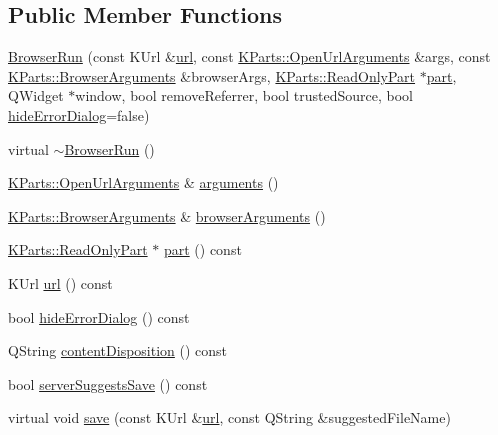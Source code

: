 \subsection*{\-Public \-Member \-Functions}
\begin{DoxyCompactItemize}
\item 
\hyperlink{classKParts_1_1BrowserRun_a48308a3cd53da552fb60a86400d06228}{\-Browser\-Run} (const \-K\-Url \&\hyperlink{classKParts_1_1BrowserRun_ad3f7d10647ab8b5a77399f46df92046b}{url}, const \hyperlink{classKParts_1_1OpenUrlArguments}{\-K\-Parts\-::\-Open\-Url\-Arguments} \&args, const \hyperlink{structKParts_1_1BrowserArguments}{\-K\-Parts\-::\-Browser\-Arguments} \&browser\-Args, \hyperlink{classKParts_1_1ReadOnlyPart}{\-K\-Parts\-::\-Read\-Only\-Part} $\ast$\hyperlink{classKParts_1_1BrowserRun_a65886b4004c00ddcc08b976f1042d0dc}{part}, \-Q\-Widget $\ast$window, bool remove\-Referrer, bool trusted\-Source, bool \hyperlink{classKParts_1_1BrowserRun_a1caa242a8389d61d6758e25a68f9df50}{hide\-Error\-Dialog}=false)
\item 
virtual \hyperlink{classKParts_1_1BrowserRun_aa141423e9096f956970d4fe92e581814}{$\sim$\-Browser\-Run} ()
\item 
\hyperlink{classKParts_1_1OpenUrlArguments}{\-K\-Parts\-::\-Open\-Url\-Arguments} \& \hyperlink{classKParts_1_1BrowserRun_a5843399feb9cafe9a2f62b258c2f5a31}{arguments} ()
\item 
\hyperlink{structKParts_1_1BrowserArguments}{\-K\-Parts\-::\-Browser\-Arguments} \& \hyperlink{classKParts_1_1BrowserRun_a7fb44c1871cf67132853d8bb59dfe006}{browser\-Arguments} ()
\item 
\hyperlink{classKParts_1_1ReadOnlyPart}{\-K\-Parts\-::\-Read\-Only\-Part} $\ast$ \hyperlink{classKParts_1_1BrowserRun_a65886b4004c00ddcc08b976f1042d0dc}{part} () const 
\item 
\-K\-Url \hyperlink{classKParts_1_1BrowserRun_ad3f7d10647ab8b5a77399f46df92046b}{url} () const 
\item 
bool \hyperlink{classKParts_1_1BrowserRun_a1caa242a8389d61d6758e25a68f9df50}{hide\-Error\-Dialog} () const 
\item 
\-Q\-String \hyperlink{classKParts_1_1BrowserRun_aa0ffe2da032f4e14eb6c7ba5f0d9996f}{content\-Disposition} () const 
\item 
bool \hyperlink{classKParts_1_1BrowserRun_a7daa3c6e44b8a37aa9c1d010972194dc}{server\-Suggests\-Save} () const 
\item 
virtual void \hyperlink{classKParts_1_1BrowserRun_acff594a6127fe8f5f19364e1da47eccf}{save} (const \-K\-Url \&\hyperlink{classKParts_1_1BrowserRun_ad3f7d10647ab8b5a77399f46df92046b}{url}, const \-Q\-String \&suggested\-File\-Name)
\end{DoxyCompactItemize}
